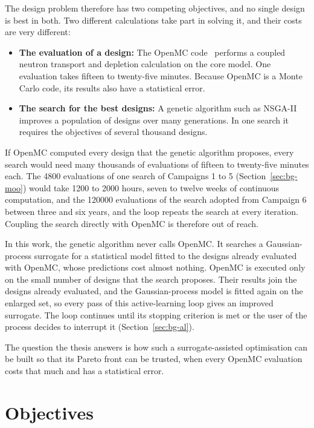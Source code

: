 The design problem therefore has two competing objectives, and no
single design is best in both. Two different calculations take part in
solving it, and their costs are very different:

\begin{itemize}
  \item \textbf{The evaluation of a design:} The OpenMC
        code~\cite{romano_openmc_2015} performs a coupled neutron transport
        and depletion calculation on the core model. One evaluation
        takes fifteen to twenty-five minutes. Because OpenMC is a Monte
        Carlo code, its results also have a statistical error.

  \item \textbf{The search for the best designs:} A genetic algorithm
        such as NSGA-II improves a population of designs over many
        generations. In one search it requires the objectives of several
        thousand designs.
\end{itemize}

If OpenMC computed every design that the genetic algorithm proposes,
every search would need many thousands of evaluations of fifteen to
twenty-five minutes each. The 4800 evaluations of one search of
Campaigns 1 to 5 (Section~\ref{sec:bg-moo}) would take 1200 to 2000
hours, seven to twelve weeks of continuous computation, and the
\num{120000} evaluations of the search adopted from Campaign 6 between
three and six years, and the loop repeats the search at every
iteration. Coupling the search directly with OpenMC is therefore out of
reach.

In this work, the genetic algorithm never calls OpenMC. It searches a
Gaussian-process surrogate for a statistical model fitted to the designs
already evaluated with OpenMC, whose predictions cost almost nothing.
OpenMC is executed only on the small number of designs that the search
proposes. Their results join the designs already evaluated, and the
Gaussian-process model is fitted again on the enlarged set, so every
pass of this active-learning loop gives an improved surrogate. The loop
continues until its stopping criterion is met or the user of the
process decides to interrupt it (Section~\ref{sec:bg-al}).

The question the thesis answers is how such a surrogate-assisted
optimisation can be built so that its Pareto front can be trusted, when
every OpenMC evaluation costs that much and has a statistical error.

\section{Objectives}
\label{sec:intro-objectives}

